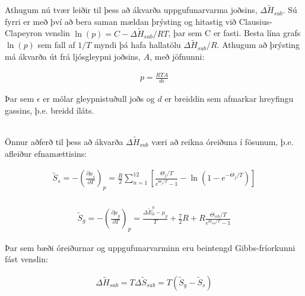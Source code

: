 \documentclass[11pt]{article}
\begin{document}
Athugum nú tvær leiðir til þess að ákvarða uppgufunarvarma joðsins, $\Delta \widetilde{H}_{sub}$. Sú fyrri er með því að bera saman mældan þrýsting og hitastig við Clausius-Clapeyron venslin $\ln(p) = C - \Delta \widetilde{H}_{sub}/RT$, þar sem C er fasti. Besta lína grafs $\ln(p)$ sem fall af $1/T$ myndi þá hafa hallatölu $\Delta \widetilde{H}_{sub}/R$. Athugum að þrýsting má ákvarða út frá ljósgleypni joðsins, $A$, með jöfnunni:

\begin{align}
p = \frac{RTA}{d\epsilon}
\end{align}

Þar sem $\epsilon$ er mólar gleypnistuðull joðs og $d$ er breiddin sem afmarkar hreyfingu gassins, þ.e. breidd íláts.

\\
Önnur aðferð til þess að ákvarða $\Delta \widetilde{H}_{sub}$ væri að reikna óreiðuna í fösunum, þ.e. afleiður efnamættisins:

\begin{align}
\widetilde{S}_{s} = -\left(\frac{\partial \mu_s}{\partial T}\right)_p = \frac{R}{2}\sum_{n=1}^{12}\left[ \frac{\Theta_j/T}{e^{\Theta_j/T}-1} - \ln(1 - e^{-\Theta_j/T}) \right]
\end{align}
\\
\begin{align}
\widetilde{S}_{g} = -\left(\frac{\partial \mu_g}{\partial T}\right)_p = \frac{\Delta \widetilde{E}_0^0 - \mu_g}{T} + \frac{7}{2}R + R\frac{\Theta_{vib}/T}{e^{\Theta_{vib}/T}-1}
\end{align}

Þar sem bæði óreiðurnar og uppgufunarvarminn eru beintengd Gibbs-fríorkunni fást venslin:

\begin{align}
\Delta \widetilde{H}_{sub} = T\Delta\widetilde{S}_{sub} = T(\widetilde{S}_{g} - \widetilde{S}_{s})
\end{align}
\end{document}
